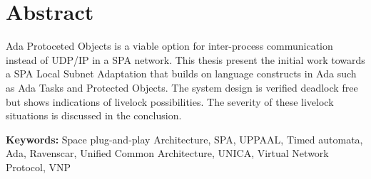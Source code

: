 \chapter*{Abstract}
\thispagestyle{empty} %
Ada Protoceted Objects is a viable option for inter-process communication
instead of UDP/IP in a SPA network. This thesis present the initial work
towards a SPA Local Subnet Adaptation that builds on language constructs in Ada
such as Ada Tasks and Protected Objects. The system design is verified deadlock
free but shows indications of livelock possibilities. The severity of these
livelock situations is discussed in the conclusion.

\textbf{Keywords:} Space plug-and-play Architecture, SPA, UPPAAL, Timed
automata, Ada, Ravenscar, Unified Common Architecture, UNICA, Virtual Network
Protocol, VNP

